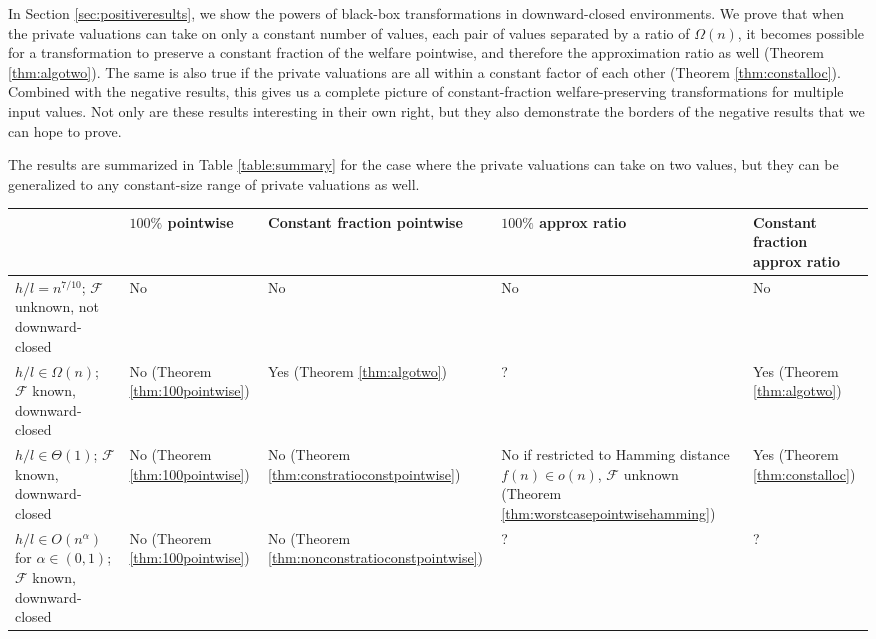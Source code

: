 \documentclass[runningheads,a4paper]{llncs}
\begin{document}
In Section \ref{sec:positiveresults}, we show the powers of black-box transformations in downward-closed environments. We prove that when the private valuations can take on only a constant number of values, each pair of values separated by a ratio of $\Omega(n)$, it becomes possible for a transformation to preserve a constant fraction of the welfare pointwise, and therefore the approximation ratio as well (Theorem \ref{thm:algotwo}). The same is also true if the private valuations are all within a constant factor of each other (Theorem \ref{thm:constalloc}). Combined with the negative results, this gives us a complete picture of constant-fraction welfare-preserving transformations for multiple input values. Not only are these results interesting in their own right, but they also demonstrate the borders of the negative results that we can hope to prove.

The results are summarized in Table \ref{table:summary} for the case where the private valuations can take on two values, but they can be generalized to any constant-size range of private valuations as well. 



    \begin{table*}
\begin{center}
    \begin{tabular}{ | p{2.4cm} | p{2cm} | p{2cm} | p{3.3cm} | p{2cm} | }
    \hline
     & $100\%$ pointwise & Constant fraction pointwise & $100\%$ approx ratio & Constant fraction approx ratio \\ \hline

    $h/l=n^{7/10}$; $\mathcal{F}$ unknown, not downward-closed & No \cite{ChawlaImLu12} & No \cite{ChawlaImLu12} & No \cite{ChawlaImLu12} & No \cite{ChawlaImLu12} \\ \hline

    $h/l\in\Omega(n)$; $\mathcal{F}$ known, downward-closed & No  (Theorem \ref{thm:100pointwise}) & Yes  (Theorem \ref{thm:algotwo}) & ? & Yes  (Theorem \ref{thm:algotwo}) \\ \hline

    $h/l\in\Theta(1)$; $\mathcal{F}$ known, downward-closed & No  (Theorem \ref{thm:100pointwise}) & No  (Theorem \ref{thm:constratioconstpointwise}) & No if restricted to Hamming distance $f(n)\in o(n)$, $\mathcal{F}$ unknown  (Theorem \ref{thm:worstcasepointwisehamming}) & Yes  (Theorem \ref{thm:constalloc}) \\ \hline

    $h/l\in O(n^\alpha)$ for $\alpha\in(0,1)$; $\mathcal{F}$ known, downward-closed & No  (Theorem \ref{thm:100pointwise}) & No (Theorem \ref{thm:nonconstratioconstpointwise}) & ? & ? \\ \hline
    \end{tabular}
    \caption{Summary of our results for the case where the private valuations take on two values $l<h$. The results can be generalized to any constant-size range of private valuations.}
    \label{table:summary}
\end{center}
    \end{table*}
\end{document}
